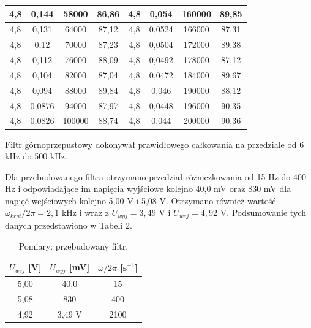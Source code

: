 \documentclass[10pt,a4paper]{article}
\begin{document}
\begin{table}[h!]
\begin{tabular}{|c|c|c|c|c|c|c|c|}
4,8           & 0,144          & 58000                    & 86,86        & 4,8           & 0,054          & 160000                   & 89,85        \\ \hline
4,8           & 0,131          & 64000                    & 87,12        & 4,8           & 0,0524         & 166000                   & 87,31        \\ \hline
4,8           & 0,12           & 70000                    & 87,23        & 4,8           & 0,0504         & 172000                   & 89,38        \\ \hline
4,8           & 0,112          & 76000                    & 88,09        & 4,8           & 0,0492         & 178000                   & 87,12        \\ \hline
4,8           & 0,104          & 82000                    & 87,04        & 4,8           & 0,0472         & 184000                   & 89,67        \\ \hline
4,8           & 0,094          & 88000                    & 89,84        & 4,8           & 0,046          & 190000                   & 88,12        \\ \hline
4,8           & 0,0876         & 94000                    & 87,97        & 4,8           & 0,0448         & 196000                   & 90,35        \\ \hline
4,8           & 0,0826         & 100000                   & 88,74        & 4,8           & 0,044          & 200000                   & 90,36        \\ \hline
\end{tabular}
\end{table}

Filtr górnoprzepustowy dokonywał prawidłowego całkowania na przedziale od 6 kHz do 500 kHz.

 Dla przebudowanego filtra otrzymano przedział różniczkowania od 15 Hz do 400 Hz i odpowiadające im napięcia wyjściowe kolejno 40,0 mV oraz 830 mV dla napięć wejściowych kolejno 5,00 V i 5,08 V. Otrzymano również wartość $\omega_{kryt}/2\pi=2,1$ kHz i wraz z $U_{wyj}=3,49$ V i $U_{wej}=4,92$ V. Podsumowanie tych danych przedstawiono w Tabeli 2.
 
 \begin{table}[h!]
\centering
\caption{Pomiary: przebudowany filtr.}
\begin{tabular}{|c|c|c|}
\hline
$U_{wej}$ [V] & $U_{wyj}$ [mV] & $\omega/2\pi$ [s$^{-1}$] \\ \hline
5,00          & 40,0           & 15                       \\ \hline
5,08          & 830            & 400                      \\ \hline
4,92          & 3,49 V        & 2100                     \\ \hline
\end{tabular}
\end{table}
 
\end{document}
